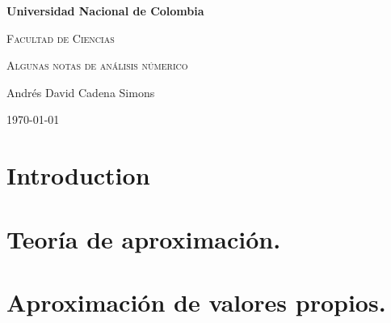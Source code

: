 \documentclass[11pt]{report}
\begin{document}

\begin{titlepage}
\centering
{\bfseries\LARGE Universidad Nacional de Colombia \par}
\vspace{1cm}
{\scshape\Large Facultad de Ciencias \par}
\vspace{3cm}
{\scshape\Huge Algunas notas de análisis númerico \par}
\vfill
{\Large Andrés David Cadena Simons \par}
\vfill
{\Large \today \par}
\end{titlepage}

\tableofcontents

\doublespacing
{} 

\chapter{Introduction}

\chapter{Teoría de aproximación.}

\chapter{Aproximación de valores propios.}


\singlespacing

\cleardoublepage
{} %

\end{document}
